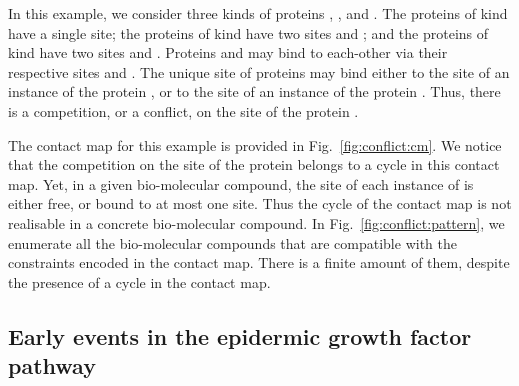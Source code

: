 \documentclass{entcs}
\begin{document}
In this example, we consider three kinds of proteins , , and . The proteins of kind  have a single site; the proteins of kind  have two sites  and ; and the proteins of kind  have two sites  and . Proteins  and  may bind to each-other via their respective sites  and .
The unique site of proteins  may bind either to the site  of an instance of the protein , or to the site  of an instance of the protein . Thus, there is a competition, or a conflict, on the site of the protein .

The contact map for this example is provided in Fig.~\ref{fig:conflict:cm}.
We notice that the competition on the site of the protein  belongs to a cycle in this contact map. Yet, in a given bio-molecular compound,
the site of each instance of  is either free, or bound to at most one site. Thus the cycle of the contact map is not realisable
in a concrete bio-molecular compound. In Fig.~\ref{fig:conflict:pattern}, we enumerate all the bio-molecular compounds that are compatible with the constraints encoded in the contact map. There is a finite amount of them, despite the presence of a cycle in the contact map.


\subsection{Early events in the epidermic growth factor pathway}

\label{sec:egfr}
\end{document}
